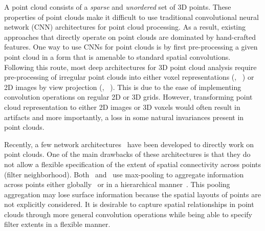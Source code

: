 \documentclass[10pt,twocolumn,letterpaper]{article}
\begin{document}
A point cloud consists of a \emph{sparse} and \emph{unordered} set of 3D points. 
These properties of point clouds make it difficult to use traditional convolutional neural network (CNN)
architectures for point cloud processing. As a result, existing approaches that directly operate on
point clouds are dominated by hand-crafted features. One way to use CNNs for point clouds is by
first pre-processing a given point cloud in a form that is amenable to standard spatial convolutions.
Following this route, most deep architectures for 3D point cloud analysis require pre-processing
of irregular point clouds into either voxel representations (\eg, ~\cite{wu2015shapenets,riegler2017octnet,wang2017ocnn}) or 
2D images by view projection (\eg, ~\cite{su15mvcnn,qi2016volmv,kalogerakis2017shapepfcn,cao2017sphericalprojection}).
This is due to the ease of implementing convolution operations on regular 2D or 3D grids.
However, transforming point cloud representation to either 2D images or 3D voxels would often result in artifacts and
more importantly, a loss in some natural invariances present in point clouds.

Recently, a few network architectures~\cite{qi2017pointnet,qi2017pointnetpp,zaheer2017deep} have been developed to directly work on point clouds.
One of the main drawbacks of these architectures is that they do not allow a flexible specification of
the extent of spatial connectivity across points (filter neighborhood). 
Both~\cite{qi2017pointnet} and~\cite{qi2017pointnetpp} use max-pooling to aggregate information across points either
globally~\cite{qi2017pointnet} or in a hierarchical manner~\cite{qi2017pointnetpp}.
This pooling aggregation may lose surface information because the spatial layouts of points are not explicitly considered.
It is desirable to capture spatial relationships in point clouds through more general convolution
operations while being able to specify filter extents in a flexible manner.
\end{document}

